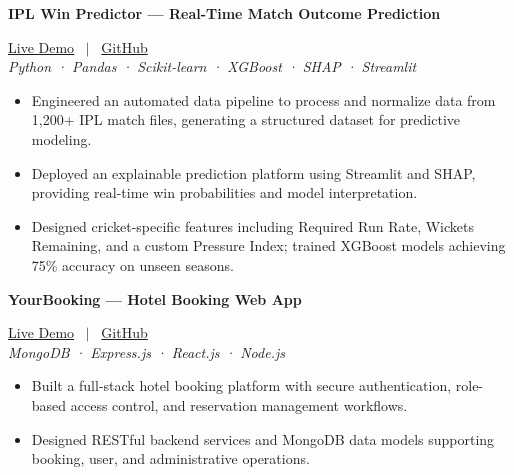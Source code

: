 \documentclass[10pt, a4paper]{article}
\begin{document}
\noindent \textbf{IPL Win Predictor --- Real-Time Match Outcome Prediction} \hfill 

\small{
\href{https://ipl-win-probability-predictor-fpzxwaxr5tepzwdugousfe.streamlit.app/}{Live Demo}
 \ $|$ \ \href{https://github.com/PankajKumar-11/IPL-Win-Probability-Predictor}{GitHub}
}
 \\
\textit{\small{Python · Pandas · Scikit-learn · XGBoost · SHAP · Streamlit}}
\begin{itemize}

    \item Engineered an automated data pipeline to process and normalize data from 1,200+ IPL match files, generating a structured dataset for predictive modeling.

    \item Deployed an explainable prediction platform using Streamlit and SHAP, providing real-time win probabilities and model interpretation.

    \item Designed cricket-specific features including Required Run Rate, Wickets Remaining, and a custom Pressure Index; trained XGBoost models achieving 75\% accuracy on unseen seasons.

\end{itemize}
\vspace{3pt}

\noindent \textbf{YourBooking --- Hotel Booking Web App} \hfill 

\small{
\href{https://yourbookingweb.netlify.app/}{Live Demo}
 \ $|$ \ \href{https://github.com/PankajKumar-11/YourBooking-Hotel-booking-Web-}{GitHub}
}
 \\
\textit{\small{MongoDB · Express.js · React.js · Node.js}}
\begin{itemize}

    \item Built a full-stack hotel booking platform with secure authentication, role-based access control, and reservation management workflows.

    \item Designed RESTful backend services and MongoDB data models supporting booking, user, and administrative operations.

\end{itemize}
\vspace{3pt}


\end{document}
